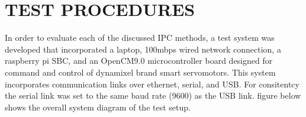 \section{TEST PROCEDURES}

In order to evaluate each of the discussed IPC methods, a test system was developed that incorporated a laptop, 100mbps wired network connection, a raspberry pi SBC, and an OpenCM9.0 microcontroller board designed for command and control of dynamixel brand smart servomotors. This system incorporates communication links over ethernet, serial, and USB. For consitentcy the serial link was set to the same baud rate (9600) as the USB link. figure{} below shows the overall system diagram of the test setup. 
